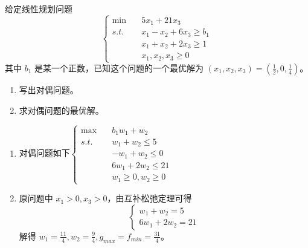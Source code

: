 \begin{problem}
    给定线性规划问题
    \[\begin{cases}
        \min \quad &5x_1 + 21x_3 \\
        s.t. \quad &x_1 - x_2 + 6x_3 \ge b_1\\
        &x_1 + x_2 + 2x_3 \ge 1\\
        &x_1, x_2, x_3 \ge 0
    \end{cases}\]
    其中 $b_1$ 是某一个正数，已知这个问题的一个最优解为 $(x_1, x_2, x_3) = (\frac{1}{2}, 0, \frac{1}{4})$。
    \begin{enumerate}
        \item 写出对偶问题。
        \item 求对偶问题的最优解。
    \end{enumerate}
\end{problem}
\begin{solution}
    \begin{enumerate}
        \item 对偶问题如下$\begin{cases}
            \max \quad &b_1w_1 + w_2\\
            s.t. \quad &w_1 + w_2 \le 5\\
            & -w_1 + w_2 \le 0\\
            &6w_1 + 2w_2 \le 21\\
            &w_1 \ge 0, w_2 \ge 0
        \end{cases}$
        \item 原问题中 $x_1 > 0, x_3 > 0$，由互补松弛定理可得\[\begin{cases}
            w_1  + w_2 = 5\\
            6w_1 + 2w_2 = 21
        \end{cases}\]
        解得 $w_1 = \frac{11}{4}, w_2 = \frac{9}{4}, g_{max} = f_{min} = \frac{31}{4}$。
    \end{enumerate}
\end{solution}

